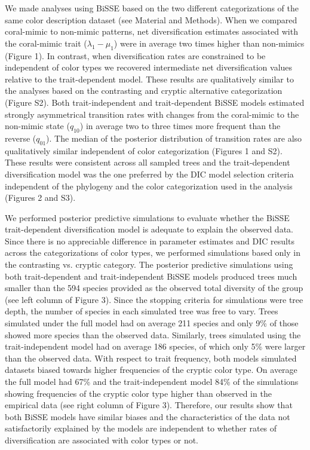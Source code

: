 We made analyses using BiSSE based on the two different categorizations of the same color description dataset (see Material and Methods). When we compared coral-mimic to non-mimic patterns, net diversification estimates associated with the coral-mimic trait ($\lambda_{1} - \mu_{1}$) were in average two times higher than non-mimics (Figure 1). In contrast, when diversification rates are constrained to be independent of color types we recovered intermediate net diversification values relative to the trait-dependent model. These results are qualitatively similar to the analyses based on the contrasting and cryptic alternative categorization (Figure S2). Both trait-independent and trait-dependent BiSSE models estimated strongly asymmetrical transition rates with changes from the coral-mimic to the non-mimic state ($q_{10}$) in average two to three times more frequent than the reverse ($q_{01}$). The median of the posterior distribution of transition rates are also qualitatively similar independent of color categorization (Figures 1 and S2). These results were consistent across all sampled trees and the trait-dependent diversification model was the one preferred by the DIC model selection criteria independent of the phylogeny and the color categorization used in the analysis (Figures 2 and S3).

We performed posterior predictive simulations to evaluate whether the BiSSE trait-dependent diversification model is adequate to explain the observed data. Since there is no appreciable difference in parameter estimates and DIC results across the categorizations of color types, we performed simulations based only in the contrasting vs. cryptic category. The posterior predictive simulations using both trait-dependent and trait-independent BiSSE models produced trees much smaller than the 594 species provided as the observed total diversity of the group (see left column of Figure 3). Since the stopping criteria for simulations were tree depth, the number of species in each simulated tree was free to vary. Trees simulated under the full model had on average 211 species and only 9\% of those showed more species than the observed data. Similarly, trees simulated using the trait-independent model had on average 186 species, of which only 5\% were larger than the observed data. With respect to trait frequency, both models simulated datasets biased towards higher frequencies of the cryptic color type. On average the full model had 67\% and the trait-independent model 84\% of the simulations showing frequencies of the cryptic color type higher than observed in the empirical data (see right column of Figure 3). Therefore, our results show that both BiSSE models have similar biases and the characteristics of the data not satisfactorily explained by the models are independent to whether rates of diversification are associated with color types or not.

